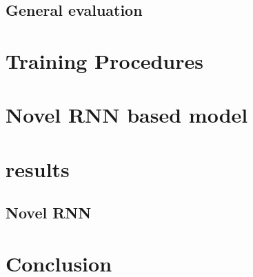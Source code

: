 \documentclass{llncs}
\begin{document}
 \subsection{General evaluation}
\section{Training Procedures}
 \section{Novel RNN based model}
 \section{results}
 \subsection{Novel RNN}
\section{Conclusion} 

 
 
%
\end{document}
